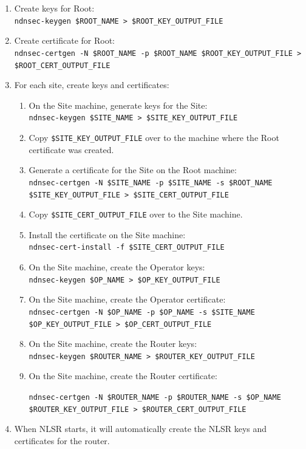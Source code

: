 \begin{enumerate}
\item Create keys for Root: \\ \texttt{ndnsec-keygen \$ROOT\_NAME > \$ROOT\_KEY\_OUTPUT\_FILE}
\item Create certificate for Root: \\ \texttt{ndnsec-certgen -N \$ROOT\_NAME -p \$ROOT\_NAME \$ROOT\_KEY\_OUTPUT\_FILE > \$ROOT\_CERT\_OUTPUT\_FILE}
\item For each site, create keys and certificates:
  \begin{enumerate}
  \item On the Site machine, generate keys for the Site: \\ \texttt{ndnsec-keygen \$SITE\_NAME > \$SITE\_KEY\_OUTPUT\_FILE}
  \item Copy \texttt{\$SITE\_KEY\_OUTPUT\_FILE} over to the machine where the Root certificate was created.
  \item Generate a certificate for the Site on the Root machine: \\ \texttt{ndnsec-certgen -N \$SITE\_NAME -p \$SITE\_NAME -s \$ROOT\_NAME \$SITE\_KEY\_OUTPUT\_FILE > \$SITE\_CERT\_OUTPUT\_FILE}
  \item Copy \texttt{\$SITE\_CERT\_OUTPUT\_FILE} over to the Site machine.
  \item Install the certificate on the Site machine: \\ \texttt{ndnsec-cert-install -f \$SITE\_CERT\_OUTPUT\_FILE}
  \item On the Site machine, create the Operator keys: \\ \texttt{ndnsec-keygen \$OP\_NAME > \$OP\_KEY\_OUTPUT\_FILE}
  \item On the Site machine, create the Operator certificate: \\ \texttt{ndnsec-certgen -N \$OP\_NAME -p \$OP\_NAME -s \$SITE\_NAME \$OP\_KEY\_OUTPUT\_FILE > \$OP\_CERT\_OUTPUT\_FILE}
  \item On the Site machine, create the Router keys: \\ \texttt{ndnsec-keygen \$ROUTER\_NAME > \$ROUTER\_KEY\_OUTPUT\_FILE}
  \item On the Site machine, create the Router certificate: \\ \begin{small}\texttt{ndnsec-certgen -N \$ROUTER\_NAME -p \$ROUTER\_NAME -s \$OP\_NAME \$ROUTER\_KEY\_OUTPUT\_FILE > \$ROUTER\_CERT\_OUTPUT\_FILE}\end{small}
  \end{enumerate}
  \item When NLSR starts, it will automatically create the NLSR keys and certificates for the router.
\end{enumerate}

